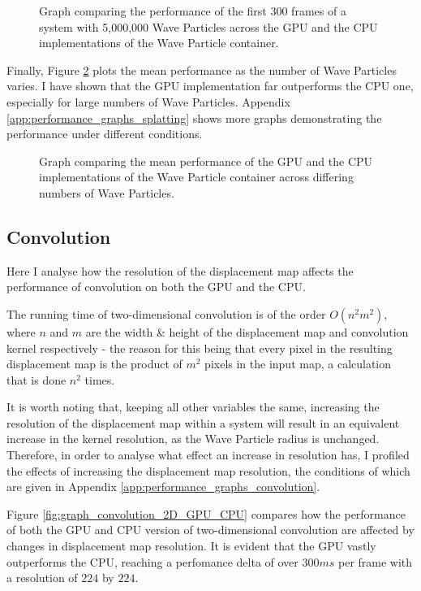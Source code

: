 \documentclass[12pt,a4paper,twoside]{report}
\begin{document}
\begin{figure}[h]
\centering

\caption{Graph comparing the performance of the first 300 frames of a system
with 5,000,000 Wave Particles across the GPU and the CPU implementations of the
Wave Particle container.}
\label{fig:graph_set_point_map_5000000}
\end{figure}

Finally, Figure \ref{fig:graph_set_point_map_averages} plots the mean
performance as the number of Wave Particles varies. I have shown that the GPU
implementation far outperforms the CPU one, especially for large numbers of
Wave Particles. Appendix \ref{app:performance_graphs_splatting} shows more
graphs demonstrating the performance under different conditions.

\begin{figure}[h]
\centering

\caption{Graph comparing the mean performance of the GPU and the CPU
implementations of the Wave Particle container across differing numbers of Wave
Particles.}
\label{fig:graph_set_point_map_averages}
\end{figure}

\subsection{Convolution}

Here I analyse how the resolution of the displacement map affects
the performance of convolution on both the GPU and the CPU.

The running time of two-dimensional convolution is of the
order $O(n^2m^2)$, where $n$ and $m$ are the width \& height of the
displacement map and convolution kernel respectively - the reason for this
being that every pixel in the resulting displacement map is the product of
$m^2$ pixels in the input map, a calculation that is done $n^2$ times.

It is worth noting that, keeping all other variables the same, increasing the
resolution of the displacement map within a system will result in an equivalent
increase in the kernel resolution, as the Wave Particle radius is unchanged.
Therefore, in order to analyse what effect an increase in resolution has, I
profiled the effects of increasing the displacement map resolution, the
conditions of which are given in Appendix
\ref{app:performance_graphs_convolution}.

Figure \ref{fig:graph_convolution_2D_GPU_CPU} compares how the performance of
both the GPU and CPU version of two-dimensional convolution are affected by
changes in displacement map resolution. It is evident that the GPU vastly
outperforms the CPU, reaching a perfomance delta of over $300ms$ per frame with
a resolution of $224$ by $224$.
\end{document}
